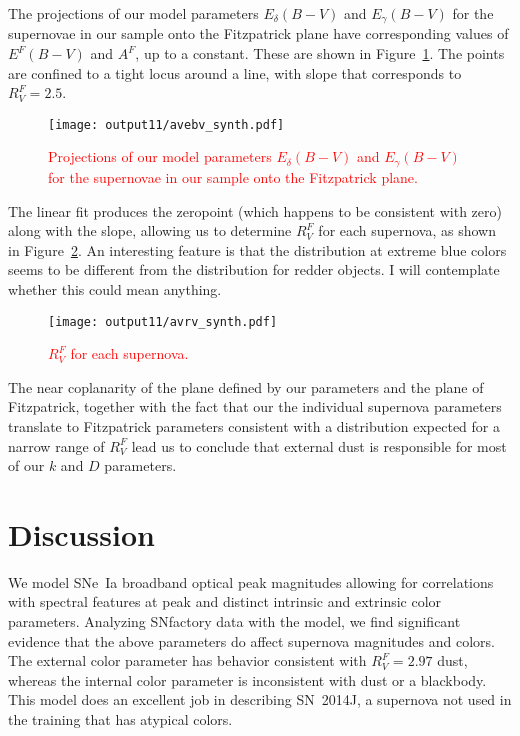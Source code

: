 \documentclass{aastex61}   	%
\begin{document}
The projections of our model parameters $E_\delta(B-V)$ and  $E_\gamma(B-V)$ for the supernovae in our sample
onto the Fitzpatrick plane
have corresponding values of $E^F(B-V)$ and $A^F$, up to a constant.  These are shown in Figure~\ref{avebv:fig}.
The points are confined to a tight locus around a line, with slope that corresponds to $R^F_V=2.5$.  

\begin{figure}[htbp] %
   \centering
   \texttt{[image: output11/avebv\_synth.pdf]}
    \caption{\textcolor{red}{Projections of our model parameters $E_\delta(B-V)$ and  $E_\gamma(B-V)$ for the supernovae in our sample
onto the Fitzpatrick plane.}
   \label{avebv:fig}}
\end{figure}

The linear fit produces the zeropoint (which happens to be consistent with zero) along with the slope, allowing us to determine $R^F_V$ for each supernova,
as shown in Figure~\ref{avrv:fig}.  An interesting feature is that the distribution at extreme blue colors seems to be different from the distribution for redder objects.
I will contemplate whether this could mean anything.

\begin{figure}[htbp] %
   \centering
   \texttt{[image: output11/avrv\_synth.pdf]}
    \caption{\textcolor{red}{$R^F_V$ for each supernova.}
   \label{avrv:fig}}
\end{figure}

The near coplanarity of the plane defined by our parameters and the plane of Fitzpatrick, together with the fact that our the individual supernova
parameters translate to Fitzpatrick parameters consistent with a distribution expected for a narrow range of $R^F_V$ lead us to conclude that 
external dust is responsible for most of our $k$ and $D$ parameters.

\section{Discussion}
\label{discussion:sec}
We model SNe~Ia broadband optical peak magnitudes allowing for correlations with spectral features at peak and distinct intrinsic and
extrinsic color parameters.  Analyzing SNfactory data with the model, we find significant evidence that the above parameters do
affect supernova magnitudes and colors.  The external color parameter has behavior consistent with  $R^F_V=2.97$ \citet{1999PASP..111...63F} dust,
whereas the internal color parameter is inconsistent with dust or a blackbody.  This model  does an excellent job in
describing SN~2014J, a supernova not used in the training that has atypical colors.
\end{document}
